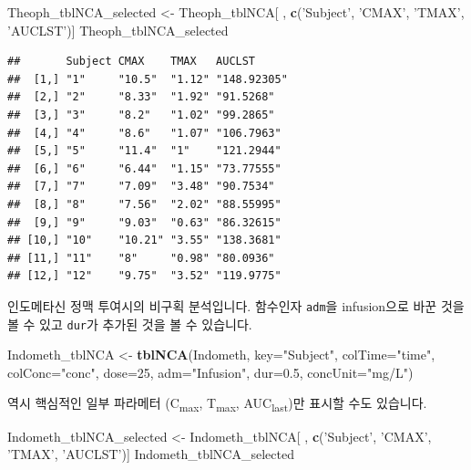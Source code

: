 \documentclass[12pt,]{krantz}
\newenvironment{Shaded}{\begin{snugshade}}{\end{snugshade}}
\newcommand{\KeywordTok}[1]{\textcolor[rgb]{0.13,0.29,0.53}{\textbf{#1}}}
\newcommand{\DataTypeTok}[1]{\textcolor[rgb]{0.13,0.29,0.53}{#1}}
\newcommand{\DecValTok}[1]{\textcolor[rgb]{0.00,0.00,0.81}{#1}}
\newcommand{\FloatTok}[1]{\textcolor[rgb]{0.00,0.00,0.81}{#1}}
\newcommand{\StringTok}[1]{\textcolor[rgb]{0.31,0.60,0.02}{#1}}
\newcommand{\NormalTok}[1]{#1}
\begin{document}
\begin{Shaded}
\begin{Highlighting}[]
\NormalTok{Theoph_tblNCA_selected <-}\StringTok{ }\NormalTok{Theoph_tblNCA[ , }\KeywordTok{c}\NormalTok{(}\StringTok{'Subject'}\NormalTok{, }\StringTok{'CMAX'}\NormalTok{, }\StringTok{'TMAX'}\NormalTok{, }\StringTok{'AUCLST'}\NormalTok{)]}
\NormalTok{Theoph_tblNCA_selected}
\end{Highlighting}
\end{Shaded}

\begin{verbatim}
##       Subject CMAX    TMAX   AUCLST     
##  [1,] "1"     "10.5"  "1.12" "148.92305"
##  [2,] "2"     "8.33"  "1.92" "91.5268"  
##  [3,] "3"     "8.2"   "1.02" "99.2865"  
##  [4,] "4"     "8.6"   "1.07" "106.7963" 
##  [5,] "5"     "11.4"  "1"    "121.2944" 
##  [6,] "6"     "6.44"  "1.15" "73.77555" 
##  [7,] "7"     "7.09"  "3.48" "90.7534"  
##  [8,] "8"     "7.56"  "2.02" "88.55995" 
##  [9,] "9"     "9.03"  "0.63" "86.32615" 
## [10,] "10"    "10.21" "3.55" "138.3681" 
## [11,] "11"    "8"     "0.98" "80.0936"  
## [12,] "12"    "9.75"  "3.52" "119.9775"
\end{verbatim}

인도메타신 정맥 투여시의 비구획 분석입니다. 함수인자 \texttt{adm}을
infusion으로 바꾼 것을 볼 수 있고 \texttt{dur}가 추가된 것을 볼 수
있습니다.

\begin{Shaded}
\begin{Highlighting}[]
\NormalTok{Indometh_tblNCA <-}\StringTok{ }\KeywordTok{tblNCA}\NormalTok{(Indometh, }\DataTypeTok{key=}\StringTok{"Subject"}\NormalTok{, }\DataTypeTok{colTime=}\StringTok{"time"}\NormalTok{, }\DataTypeTok{colConc=}\StringTok{"conc"}\NormalTok{, }\DataTypeTok{dose=}\DecValTok{25}\NormalTok{, }
       \DataTypeTok{adm=}\StringTok{"Infusion"}\NormalTok{, }\DataTypeTok{dur=}\FloatTok{0.5}\NormalTok{, }\DataTypeTok{concUnit=}\StringTok{"mg/L"}\NormalTok{)}
\end{Highlighting}
\end{Shaded}

역시 핵심적인 일부 파라메터 (C\textsubscript{max}, T\textsubscript{max},
AUC\textsubscript{last})만 표시할 수도 있습니다.

\begin{Shaded}
\begin{Highlighting}[]
\NormalTok{Indometh_tblNCA_selected <-}\StringTok{ }\NormalTok{Indometh_tblNCA[ , }\KeywordTok{c}\NormalTok{(}\StringTok{'Subject'}\NormalTok{, }\StringTok{'CMAX'}\NormalTok{, }\StringTok{'TMAX'}\NormalTok{, }\StringTok{'AUCLST'}\NormalTok{)]}
\NormalTok{Indometh_tblNCA_selected}
\end{Highlighting}
\end{Shaded}
\end{document}

